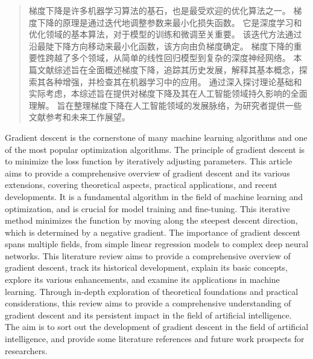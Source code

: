 \documentclass[printMode=false, declarePage=false]{ecnuthesis}
\date{} %
\begin{document}
    \tableofcontents

    \frontmatter

    \begin{abstract}
        梯度下降是许多机器学习算法的基石，也是最受欢迎的优化算法之一。
        梯度下降的原理是通过迭代地调整参数来最小化损失函数。
        它是深度学习和优化领域的基本算法，对于模型的训练和微调至关重要。
        该迭代方法通过沿最陡下降方向移动来最小化函数，该方向由负梯度确定。
        梯度下降的重要性跨越了多个领域，从简单的线性回归模型到复杂的深度神经网络。
        本篇文献综述旨在全面概述梯度下降，追踪其历史发展，解释其基本概念，探索其各种增强，并检查其在机器学习中的应用。
        通过深入探讨理论基础和实际考虑，本综述旨在提供对梯度下降及其在人工智能领域持久影响的全面理解。
        旨在整理梯度下降在人工智能领域的发展脉络，为研究者提供一些文献参考和未来工作展望。
    \end{abstract}

    \begin{abstractEN}
        Gradient descent is the cornerstone of many machine learning algorithms and one of the most popular optimization algorithms.
        The principle of gradient descent is to minimize the loss function by iteratively adjusting parameters.
        This article aims to provide a comprehensive overview of gradient descent and its various extensions, covering theoretical aspects, practical applications, and recent developments.
        It is a fundamental algorithm in the field of machine learning and optimization, and is crucial for model training and fine-tuning.
        This iterative method minimizes the function by moving along the steepest descent direction, which is determined by a negative gradient.
        The importance of gradient descent spans multiple fields, from simple linear regression models to complex deep neural networks.
        This literature review aims to provide a comprehensive overview of gradient descent, track its historical development,
        explain its basic concepts, explore its various enhancements, 
        and examine its applications in machine learning.
        Through in-depth exploration of theoretical foundations and practical considerations, 
        this review aims to provide a comprehensive understanding of gradient descent and its persistent 
        impact in the field of artificial intelligence.
        The aim is to sort out the development of gradient descent in the field of artificial intelligence, and provide some literature references and future work prospects for researchers.
    \end{abstractEN}
\end{document}
